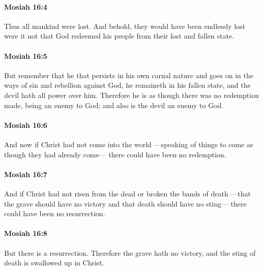 		\paragraph{Mosiah 16:4} %
			\label{MOSIAH-16-4}

			Thus all mankind were lost.
			And behold, they would have been endlessly lost
			were it not that God redeemed his people from their lost and fallen state.

		\paragraph{Mosiah 16:5} %
			\label{MOSIAH-16-5}

			But remember that he that persists in his own carnal nature
			and goes on in the ways of sin and rebellion against God,
			he remaineth in his fallen state,
			and the devil hath all power over him.
			Therefore he is as though there was no redemption made,
			being an enemy to God;
			and also is the devil an enemy to God.

		\paragraph{Mosiah 16:6} %
			\label{MOSIAH-16-6}

			And now if Christ had not come into the world
			---speaking of things to come as though they had already come---
			there could have been no redemption.

		\paragraph{Mosiah 16:7} %
			\label{MOSIAH-16-7}

			And if Christ had not risen from the dead
			or broken the bands of death
			---that the grave should have no victory
			and that death should have no sting---
			there could have been no resurrection.

		\paragraph{Mosiah 16:8} %
			\label{MOSIAH-16-8}

			But there is a resurrection.
			Therefore the grave hath no victory,
			and the sting of death is swallowed up in Christ.

